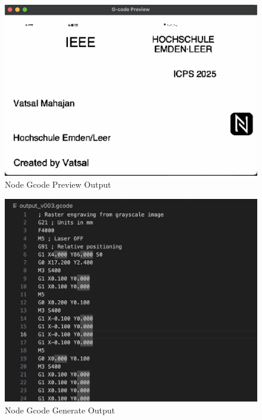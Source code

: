 			\begin{figure}
	\begin{center}
		\includegraphics[width=0.6\linewidth]{Images/GcodeP.png}
		\caption{Node Gcode Preview Output}
		\label{GcodeP} 
	\end{center}
\end{figure}

\begin{figure}
	\begin{center}
		\includegraphics[width=0.6\linewidth]{Images/Gcode.png}
		\caption{Node Gcode Generate Output}
		\label{Gcode} 
	\end{center}
\end{figure}

